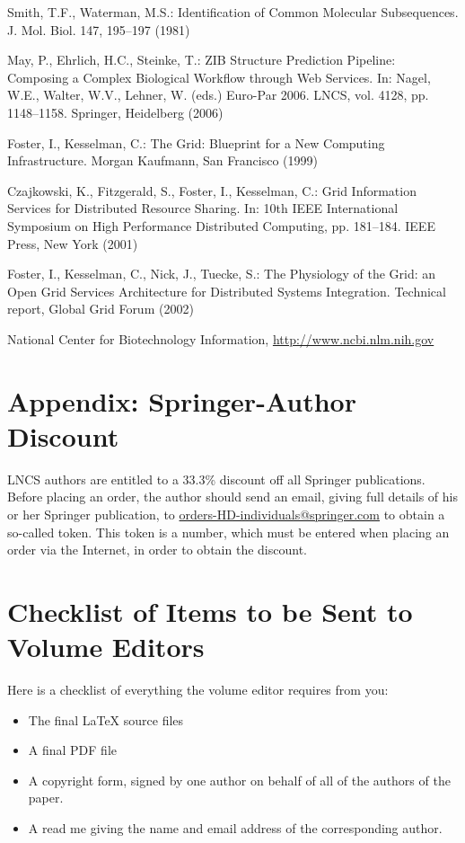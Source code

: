 \documentclass[runningheads,a4paper]{llncs}
\begin{document}
{}


\begin{thebibliography}{4}

 Smith, T.F., Waterman, M.S.: Identification of Common Molecular
Subsequences. J. Mol. Biol. 147, 195--197 (1981)

 May, P., Ehrlich, H.C., Steinke, T.: ZIB Structure Prediction Pipeline:
Composing a Complex Biological Workflow through Web Services. In: Nagel,
W.E., Walter, W.V., Lehner, W. (eds.) Euro-Par 2006. LNCS, vol. 4128,
pp. 1148--1158. Springer, Heidelberg (2006)

 Foster, I., Kesselman, C.: The Grid: Blueprint for a New Computing
Infrastructure. Morgan Kaufmann, San Francisco (1999)

 Czajkowski, K., Fitzgerald, S., Foster, I., Kesselman, C.: Grid
Information Services for Distributed Resource Sharing. In: 10th IEEE
International Symposium on High Performance Distributed Computing, pp.
181--184. IEEE Press, New York (2001)

 Foster, I., Kesselman, C., Nick, J., Tuecke, S.: The Physiology of the
Grid: an Open Grid Services Architecture for Distributed Systems
Integration. Technical report, Global Grid Forum (2002)

 National Center for Biotechnology Information, \url{http://www.ncbi.nlm.nih.gov}

\end{thebibliography}


\section*{Appendix: Springer-Author Discount}

LNCS authors are entitled to a 33.3\% discount off all Springer
publications. Before placing an order, the author should send an email, 
giving full details of his or her Springer publication,
to \url{orders-HD-individuals@springer.com} to obtain a so-called token. This token is a
number, which must be entered when placing an order via the Internet, in
order to obtain the discount.

\section{Checklist of Items to be Sent to Volume Editors}
Here is a checklist of everything the volume editor requires from you:


\begin{itemize}
\settowidth{\leftmargin}{{\Large$\square$}}\advance\leftmargin{}
\itemsep8pt\relax
\renewcommand\labelitemi{{\lower1.5pt\hbox{\Large$\square$}}}

\item The final \LaTeX{} source files
\item A final PDF file
\item A copyright form, signed by one author on behalf of all of the
authors of the paper.
\item A read me giving the name and email address of the
corresponding author.
\end{itemize}
\end{document}
